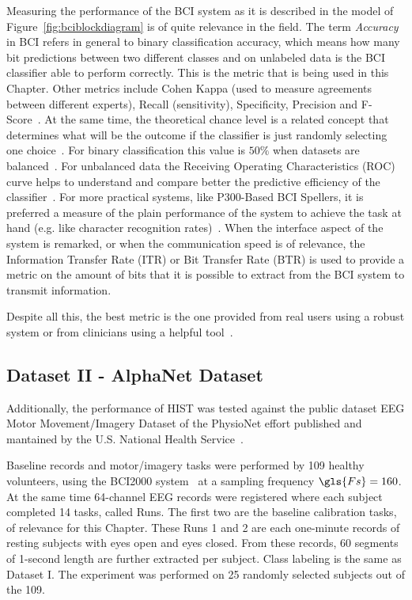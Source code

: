 \begin{story}
Measuring the performance of the BCI system as it is described in the model of Figure~\ref{fig:bciblockdiagram} is of quite relevance in the field.  The term \textit{Accuracy} in BCI refers in general to binary classification accuracy, which means how many bit predictions between two different classes and on unlabeled data is the BCI classifier able to perform correctly.  This is the metric that is being used in this Chapter.  Other metrics include Cohen Kappa (used to measure agreements between different experts), Recall (sensitivity), Specificity, Precision and F-Score~\cite{Nicolas-Alonso2012,Chavarriaga2017,c55,WolpawJonathanR2012,Clerc2016,Nam2018}. At the same time, the theoretical chance level is a related concept that determines what will be the outcome if the classifier is just randomly selecting one choice~\cite{Nam2018}.  For binary classification this value is $50\%$ when datasets are balanced~\cite{Tibon2015}.  For unbalanced data the Receiving Operating Characteristics (ROC) curve helps to understand and compare better the predictive efficiency of the classifier~\cite{Fawcett2006}. For more practical systems, like P300-Based BCI Spellers, it is preferred a measure of the plain performance of the system to achieve the task at hand (e.g. like character recognition rates)~\cite{Krusienski2006}. When the interface aspect of the system is remarked, or when the communication speed is of relevance, the Information Transfer Rate (ITR) or Bit Transfer Rate (BTR) is used to provide a metric on the amount of bits that it is possible to extract from the BCI system to transmit information.

Despite all this, the best metric is the one provided from real users using a robust system or from clinicians using a helpful tool~\cite{Huggins2015,Nijboer2009,c56}.

\end{story}
      
\subsection{Dataset II - AlphaNet Dataset}
Additionally, the performance of HIST was tested against the public dataset EEG Motor Movement/Imagery Dataset of the PhysioNet effort published and mantained by the U.S. National Health Service~\cite{Schalk2004,Goldberger2000}.  

Baseline records and motor/imagery tasks were performed by 109 healthy volunteers, using the BCI2000 system~\cite{Schalk2004} at a sampling frequency $\gls{Fs} = 160$.  At the same time 64-channel EEG records were registered where each subject completed 14 tasks, called Runs.  The first two are the baseline calibration tasks, of relevance for this Chapter.  These Runs 1 and 2 are each one-minute records of resting subjects with eyes open and eyes closed.  From these records, 60 segments of 1-second length are further extracted per subject. Class labeling is the same as Dataset I.  The experiment was performed on 25 randomly selected subjects out of the 109.


